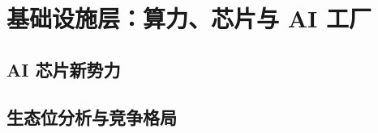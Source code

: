 \chapter{基础设施层：算力、芯片与 AI 工厂}
\label{ch:infrastructure}




\section{AI 芯片新势力}
\label{sec:infra-chips}













\section{生态位分析与竞争格局}
\label{sec:infra-landscape}

